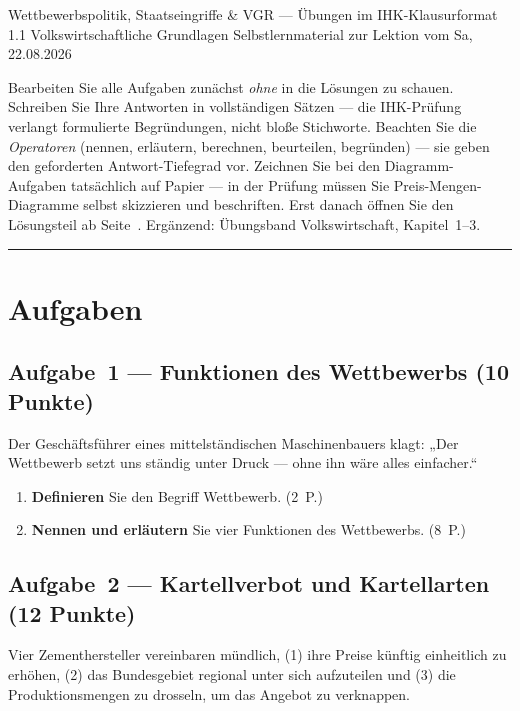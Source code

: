 \documentclass[11pt, a4paper]{article}
\begin{document}
%
  {Wettbewerbspolitik, Staatseingriffe \& VGR --- Übungen im IHK-Klausurformat}%
  {1.1 Volkswirtschaftliche Grundlagen}%
  {Selbstlernmaterial zur Lektion vom Sa, 22.08.2026}


\begin{merksatz}[title={\bfseries So nutzen Sie dieses Aufgabenheft}]
Bearbeiten Sie alle Aufgaben zunächst \emph{ohne} in die Lösungen zu schauen. Schreiben
Sie Ihre Antworten in vollständigen Sätzen --- die IHK-Prüfung verlangt formulierte
Begründungen, nicht bloße Stichworte. Beachten Sie die \emph{Operatoren} (nennen,
erläutern, berechnen, beurteilen, begründen) --- sie geben den geforderten
Antwort-Tiefegrad vor. Zeichnen Sie bei den Diagramm-Aufgaben tatsächlich auf Papier ---
in der Prüfung müssen Sie Preis-Mengen-Diagramme selbst skizzieren und beschriften. Erst
danach öffnen Sie den Lösungsteil ab Seite~\pageref{loesungen}. Ergänzend: Übungsband
Volkswirtschaft, Kapitel~1--3.
\end{merksatz}

\tableofcontents
\vspace{1em}
\hrule

\section{Aufgaben}

\subsection*{Aufgabe~1 --- Funktionen des Wettbewerbs (10 Punkte)}

Der Geschäftsführer eines mittelständischen Maschinenbauers klagt: „Der Wettbewerb setzt
uns ständig unter Druck --- ohne ihn wäre alles einfacher.``

\begin{enumerate}[label=(\alph*)]
  \item \textbf{Definieren} Sie den Begriff Wettbewerb. \hfill (2~P.)
  \item \textbf{Nennen und erläutern} Sie vier Funktionen des Wettbewerbs. \hfill (8~P.)
\end{enumerate}

\subsection*{Aufgabe~2 --- Kartellverbot und Kartellarten (12 Punkte)}

Vier Zementhersteller vereinbaren mündlich, (1) ihre Preise künftig einheitlich zu
erhöhen, (2) das Bundesgebiet regional unter sich aufzuteilen und (3) die
Produktionsmengen zu drosseln, um das Angebot zu verknappen.
\end{document}
